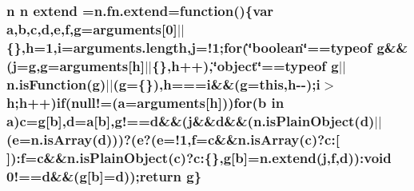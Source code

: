 \subsubsection[{\texorpdfstring{extend}{extend}}]{\setlength{\rightskip}{0pt plus 5cm}n n extend =n.\+fn.\+extend=function()\{var {\bf a},{\bf b},{\bf c},{\bf d},{\bf e},{\bf f},{\bf g}=arguments\mbox{[}0\mbox{]}$\vert$$\vert$\{\},{\bf h}=1,{\bf i}={\bf arguments.\+length},{\bf j}=!1;{\bf for}(\char`\"{}boolean\char`\"{}==typeof {\bf g}\&\&({\bf j}={\bf g},{\bf g}=arguments\mbox{[}{\bf h}\mbox{]}$\vert$$\vert$\{\},{\bf h}++),\char`\"{}object\char`\"{}==typeof {\bf g}$\vert$$\vert${\bf n.\+is\+Function}({\bf g})$\vert$$\vert$({\bf g}=\{\}),{\bf h}==={\bf i}\&\&({\bf g}=this,{\bf h}-\/-\/);{\bf i}$>${\bf h};{\bf h}++){\bf if}(null!=({\bf a}=arguments\mbox{[}{\bf h}\mbox{]})){\bf for}({\bf b} in {\bf a}){\bf c}={\bf g}\mbox{[}{\bf b}\mbox{]},{\bf d}={\bf a}\mbox{[}{\bf b}\mbox{]},g!=={\bf d}\&\&({\bf j}\&\&{\bf d}\&\&({\bf n.\+is\+Plain\+Object}({\bf d})$\vert$$\vert$({\bf e}={\bf n.\+is\+Array}({\bf d})))?({\bf e}?({\bf e}=!1,{\bf f}={\bf c}\&\&{\bf n.\+is\+Array}({\bf c})?c\+:\mbox{[}$\,$\mbox{]})\+:{\bf f}={\bf c}\&\&{\bf n.\+is\+Plain\+Object}({\bf c})?c\+:\{\},{\bf g}\mbox{[}{\bf b}\mbox{]}=n.\+extend({\bf j},{\bf f},{\bf d}))\+:void 0!=={\bf d}\&\&({\bf g}\mbox{[}{\bf b}\mbox{]}={\bf d}));return {\bf g}\}}\hypertarget{jquery-2_82_81_8min_8js_a95a6433c7ca35778b94dc2489f6838c9}{}\label{jquery-2_82_81_8min_8js_a95a6433c7ca35778b94dc2489f6838c9}
